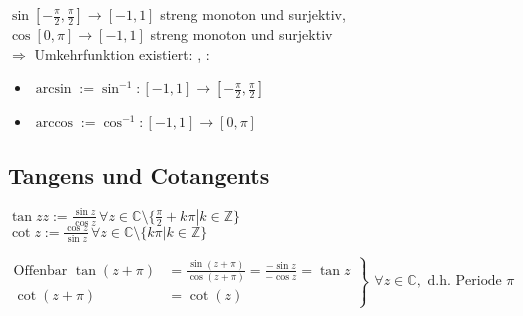 \begin{*definition}
	$\sin\left[ -\frac{\pi}{2},\frac{\pi}{2}\right]\to [-1,1]$ streng monoton und surjektiv,\\
	$\cos[0,\pi]\to[-1,1]$ streng monoton und surjektiv\\
	$\Rightarrow$ Umkehrfunktion existiert: , :
	\begin{itemize}
		\item $\arcsin := \sin^{-1}: [-1,1]\to\left[-\frac{\pi}{2},\frac{\pi}{2}\right]$
		\item $\arccos := \cos^{-1}: [-1,1]\to [0,\pi]$
	\end{itemize}
\end{*definition}

\subsection*{Tangens und Cotangents}
\begin{*definition}
	$\tan z z := \frac{\sin z}{\cos z}\,\forall z\in\mathbb{C}\setminus\{ \left.\frac{\pi}{2} + k\pi \right| k\in\mathbb{Z}\}$\\
	$\cot z := \frac{\cos z}{\sin z}\,\forall z\in\mathbb{C}\setminus \{ k\pi | k\in\mathbb{Z}\}$
	
	$\left.\begin{aligned}
		\text{Offenbar }\tan (z+\pi) &= \frac{\sin (z+\pi)}{\cos(z+\pi)} = \frac{-\sin z}{-\cos z} = \tan z\\
		\cot(z+\pi) &= \cot (z)
	\end{aligned}\right\rbrace
	\begin{gathered}
		\forall z\in\mathbb{C}, \text{ d.h. Periode $\pi$}
	\end{gathered}
	$
\end{*definition}

